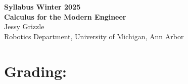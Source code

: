 \documentclass[letterpaper]{book}
\begin{document}



\begin{center}
    {\Huge \bf Syllabus Winter 2025\\ Calculus for the Modern Engineer \\}
    {\large Jessy Grizzle\\ Robotics Department, University of Michigan, Ann Arbor}
\end{center}

\bigskip

\section*{Grading:}
\end{document}
